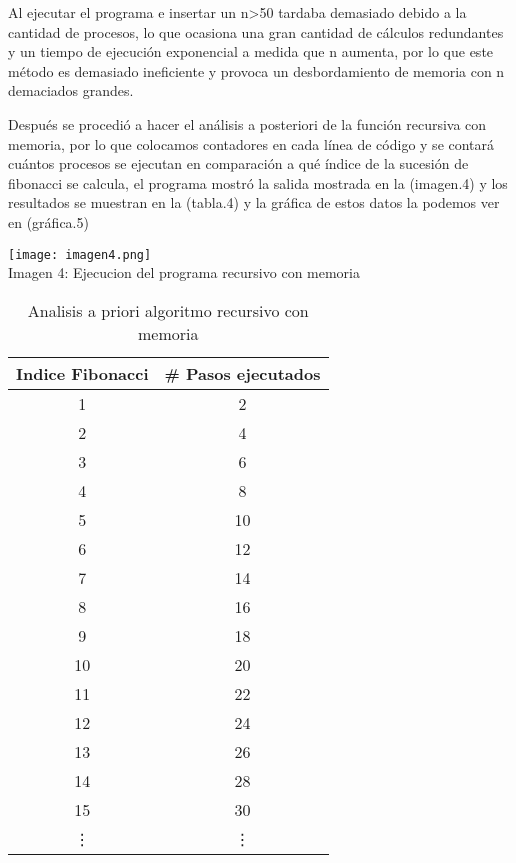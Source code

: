 \documentclass[12pt,twoside]{article}
\begin{document}
Al ejecutar el programa e insertar un n\textgreater   50  tardaba demasiado debido a la cantidad de procesos, lo que ocasiona una gran cantidad de cálculos redundantes y un tiempo de ejecución exponencial a medida que n aumenta, por lo que este método es demasiado ineficiente y provoca un desbordamiento de memoria con n demaciados grandes.



Después se procedió a hacer el análisis a posteriori de la función recursiva con memoria, por lo que colocamos contadores en cada línea de código y se contará cuántos procesos se ejecutan en comparación a qué índice de la sucesión de fibonacci se calcula, el programa mostró la salida mostrada en la (imagen.4) y  los resultados se muestran en la (tabla.4) y la gráfica de estos datos la podemos ver en (gráfica.5)

\begin{center}
  \begin{minipage}{\linewidth}
    \centering
    \texttt{[image: imagen4.png]}
    \\
    Imagen 4: Ejecucion del programa recursivo con memoria
\end{minipage}
\end{center}
\medskip

\begin{table}[h]
    \centering
    \begin{minipage}{.45\linewidth}
      \centering
      \begin{tabular}{|c|c|}
        \hline
        \textbf{Indice Fibonacci} & \textbf{\# Pasos ejecutados} \\
        \hline

    1	& 2 \\
    2	& 4 \\
    3	& 6 \\
    4	& 8 \\
    5	& 10 \\
    6	& 12 \\
    7	& 14 \\
    8	& 16 \\
    9	& 18 \\
    10 & 20 \\
    11 & 22 \\
    12 & 24 \\
    13 & 26 \\
    14 & 28 \\
    15 & 30 \\
    \vdots & \vdots\\

       
        \hline
      \end{tabular}
      \caption{Analisis a priori algoritmo recursivo con memoria}
      \label{tab:nombre_etiqueta}
    \end{minipage}
\end{table}
\end{document}
